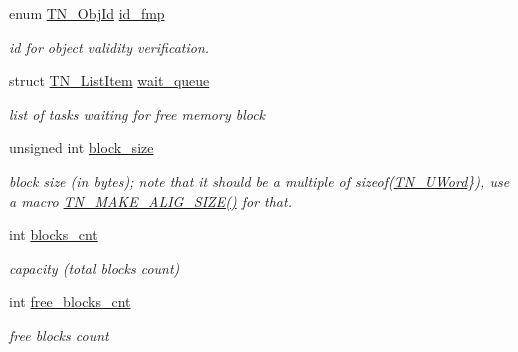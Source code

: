 \begin{DoxyCompactItemize}
\item 
enum \hyperlink{tn__common_8h_ae779dd1f6735f6e139fb70acd004d976}{T\+N\+\_\+\+Obj\+Id} \hyperlink{structTN__FMem_aee1235a605f90d80ec16547ea647eaff}{id\+\_\+fmp}
\begin{DoxyCompactList}\small\item\em id for object validity verification. \end{DoxyCompactList}\item 
\mbox{\label{structTN__FMem_a63b47b05e191f4339509eef97027ca1c}} 
struct \hyperlink{structTN__ListItem}{T\+N\+\_\+\+List\+Item} \hyperlink{structTN__FMem_a63b47b05e191f4339509eef97027ca1c}{wait\+\_\+queue}
\begin{DoxyCompactList}\small\item\em list of tasks waiting for free memory block \end{DoxyCompactList}\item 
unsigned int \hyperlink{structTN__FMem_a101e3e0eeb2774309a55ed1d6cad8e3f}{block\+\_\+size}
\begin{DoxyCompactList}\small\item\em block size (in bytes); note that it should be a multiple of {\ttfamily sizeof(\hyperlink{tn__arch__example_8h_ab80cba0fe9ffcd9011d53dfeb9e39bf4}{T\+N\+\_\+\+U\+Word}\})}, use a macro {\ttfamily \hyperlink{tn__common_8h_a3f48380e8a624edc643319a81192d88e}{T\+N\+\_\+\+M\+A\+K\+E\+\_\+\+A\+L\+I\+G\+\_\+\+S\+I\+Z\+E()}} for that. \end{DoxyCompactList}\item 
\mbox{\label{structTN__FMem_a8c8bb7a3ac8228a865bbbea1edde9ea0}} 
int \hyperlink{structTN__FMem_a8c8bb7a3ac8228a865bbbea1edde9ea0}{blocks\+\_\+cnt}
\begin{DoxyCompactList}\small\item\em capacity (total blocks count) \end{DoxyCompactList}\item 
\mbox{\label{structTN__FMem_abf2618d6322b1339d7b3d60c6e080cb1}} 
int \hyperlink{structTN__FMem_abf2618d6322b1339d7b3d60c6e080cb1}{free\+\_\+blocks\+\_\+cnt}
\begin{DoxyCompactList}\small\item\em free blocks count \end{DoxyCompactList}\item 

\end{DoxyCompactItemize}
